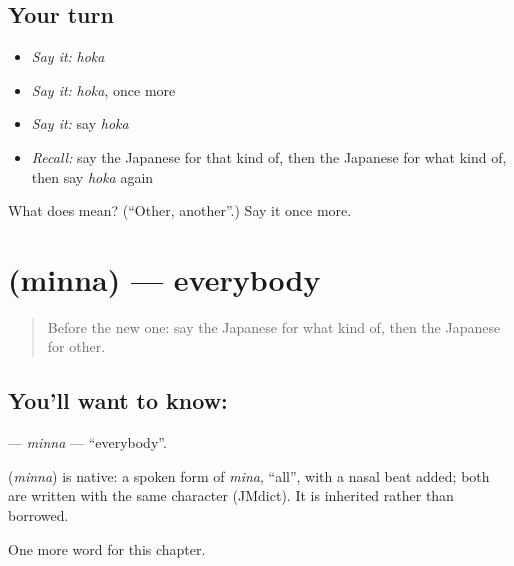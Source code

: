 \subsection*{Your turn}
\begin{itemize}
\raggedright
  \item \emph{Say it:} \emph{hoka}
  \item \emph{Say it:} \emph{hoka}, once more
  \item \emph{Say it:} say \emph{hoka}
  \item \emph{Recall:} say the Japanese for that kind of, then the Japanese for what kind of, then say \emph{hoka} again
\end{itemize}

\begin{tcolorbox}[breakable,colback=teal!4,colframe=teal!35!black,title={Before you move on}]
What does  mean? (\textquotedblleft{}Other, another\textquotedblright{}.) Say it once more.
\end{tcolorbox}
\section[\texorpdfstring{\ja{みんな} (minna)}{みんな (minna)}]{ (minna) — everybody}

\label{lesson:JA-C84-minna}



\begin{quote}
Before the new one: say the Japanese for what kind of, then the Japanese for other.
\end{quote}

\subsection*{You'll want to know: }
\textbf{} — \emph{minna} — \textquotedblleft{}everybody\textquotedblright{}.

\begin{cousinweb}
\textbf{} (\emph{minna}) is native: a spoken form of \emph{mina}, \textquotedblleft{}all\textquotedblright{}, with a nasal beat added; both are written with the same character (JMdict). It is inherited rather than borrowed.
\end{cousinweb}

\begin{grammarlens}[title={What you've built}]
One more word for this chapter.
\end{grammarlens}

